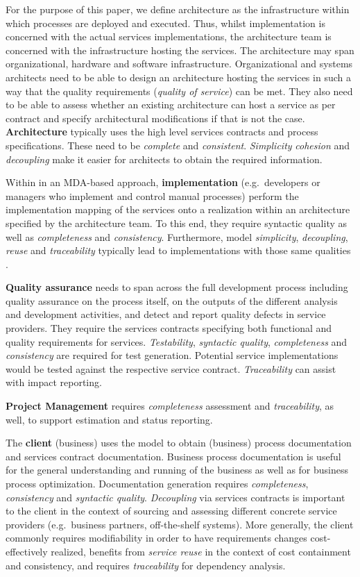 For the purpose of this paper, we define architecture as the infrastructure within which processes are deployed and executed. Thus, whilst implementation is concerned with the actual services implementations, the architecture team is concerned with the infrastructure hosting the services. The architecture may span organizational, hardware and software infrastructure. Organizational and systems architects need to be able to design an architecture hosting the services in such a way that the quality requirements (\emph{quality of service}) can be met. They also need to be able to assess whether an existing architecture can host a service as per contract and specify architectural modifications if that is not the case. {\bf Architecture} typically uses the high level services contracts and process specifications. These need to be \emph{complete} and \emph{consistent}. \emph{Simplicity} \emph{cohesion} and \emph{decoupling} make it easier for architects to obtain the required information.

Within in an MDA-based approach, {\bf implementation} (e.g.\ developers or managers who implement and control manual processes) perform the implementation mapping of the services onto a realization within an architecture specified by the architecture team. To this end, they require syntactic quality as well as \emph{completeness} and \emph{consistency}. Furthermore, model \emph{simplicity}, \emph{decoupling}, \emph{reuse} and \emph{traceability} typically lead to implementations with those same qualities \cite{podgorelec_estimating_2007}.

{\bf Quality assurance} needs to span across the full development process including quality assurance on the process itself, on the outputs of the different analysis and development activities, and detect and report quality defects in service providers. They require the services contracts specifying both functional and quality requirements for services. \emph{Testability}, \emph{syntactic quality}, \emph{completeness} and \emph{consistency} are required for test generation. Potential service implementations would be tested against the respective service contract. \emph{Traceability} can assist with impact reporting.

{\bf Project Management} requires \emph{completeness} assessment and \emph{traceability}, as well, to support estimation and status reporting.

The {\bf client} (business) uses the model to obtain (business) process documentation and services contract documentation. Business process documentation is useful for the general understanding and running of the business as well as for business process optimization. Documentation generation requires \emph{completeness}, \emph{consistency} and \emph{syntactic quality}. \emph{Decoupling} via services contracts is important to the client in the context of sourcing and assessing different concrete service providers (e.g.\ business partners, off-the-shelf systems). More generally, the client commonly requires modifiability in order to have requirements changes cost-effectively realized, benefits from \emph{service reuse} in the context of cost containment and consistency, and requires \emph{traceability} for dependency analysis.

